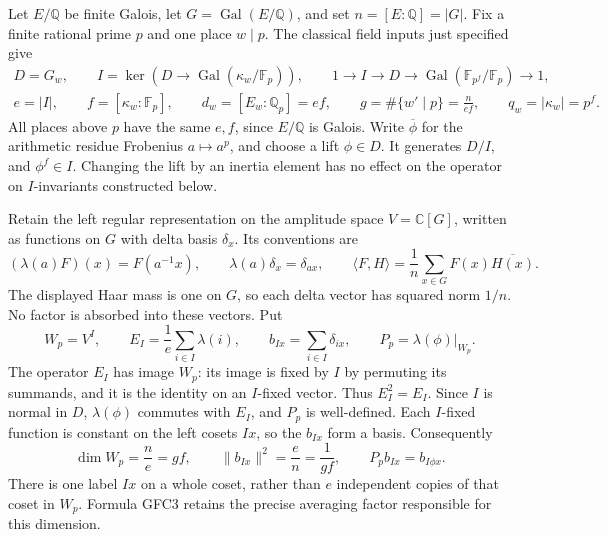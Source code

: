 Let $E/\mathbb Q$ be finite Galois, let $G=\operatorname{Gal}(E/\mathbb Q)$,
and set $n=[E:\mathbb Q]=|G|$. Fix a finite rational prime $p$ and one
place $w\mid p$. The classical field inputs just specified give
\begin{equation}\tag{GFC1}
 \begin{gathered}
 D=G_w,\qquad I=\ker(D\longrightarrow
          \operatorname{Gal}(\kappa_w/\mathbb F_p)),\qquad
 1\longrightarrow I\longrightarrow D\longrightarrow
          \operatorname{Gal}(\mathbb F_{p^f}/\mathbb F_p)
             \longrightarrow1,\\
 e=|I|,\qquad f=[\kappa_w:\mathbb F_p],\qquad
 d_w=[E_w:\mathbb Q_p]=ef,\qquad
 g=\#\{w'\mid p\}=\frac{n}{ef},\qquad q_w=|\kappa_w|=p^f.
 \end{gathered}
\end{equation}
All places above $p$ have the same $e,f$, since $E/\mathbb Q$ is Galois.
Write $\overline\phi$ for the arithmetic residue Frobenius
$a\mapsto a^p$, and choose a lift $\phi\in D$. It generates $D/I$,
and $\phi^f\in I$. Changing the lift by an inertia element has no
effect on the operator on $I$-invariants constructed below.

Retain the left regular representation on the amplitude space
$V=\mathbb C[G]$, written as functions on $G$ with delta basis
$\delta_x$. Its conventions are
\begin{equation}\tag{GFC2}
 (\lambda(a)F)(x)=F(a^{-1}x),\qquad
 \lambda(a)\delta_x=\delta_{ax},\qquad
 \langle F,H\rangle=\frac1n\sum_{x\in G}F(x)\overline{H(x)}.
\end{equation}
The displayed Haar mass is one on $G$, so each delta vector has squared
norm $1/n$. No factor is absorbed into these vectors. Put
\begin{equation}\tag{GFC3}
 W_p=V^I,\qquad E_I=\frac1e\sum_{i\in I}\lambda(i),\qquad
 b_{Ix}=\sum_{i\in I}\delta_{ix},\qquad
 P_p=\lambda(\phi)|_{W_p}.
\end{equation}
The operator $E_I$ has image $W_p$: its image is fixed by $I$ by
permuting its summands, and it is the identity on an $I$-fixed vector.
Thus $E_I^2=E_I$. Since $I$ is normal in $D$, $\lambda(\phi)$
commutes with $E_I$, and $P_p$ is well-defined. Each $I$-fixed function
is constant on the left cosets $Ix$, so the $b_{Ix}$ form a basis.
Consequently
\begin{equation}\tag{GFC4}
 \dim W_p=\frac ne=gf,\qquad
 \|b_{Ix}\|^2=\frac en=\frac1{gf},\qquad
 P_pb_{Ix}=b_{I\phi x}.
\end{equation}
There is one label $Ix$ on a whole coset, rather than $e$ independent
copies of that coset in $W_p$. Formula GFC3 retains the precise averaging
factor responsible for this dimension.

